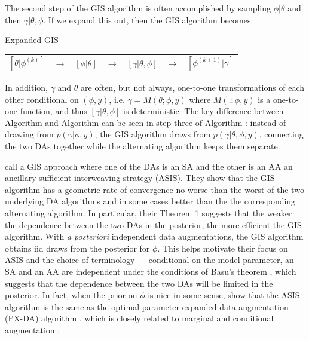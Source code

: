 \documentclass[12pt]{article}
\begin{document}
The second step of the GIS algorithm is often accomplished by sampling $\phi|\theta$ and then $\gamma|\theta,\phi$. If we expand this out, then the GIS algorithm becomes:
\begin{alg*}[eGIS]Expanded GIS\label{alg:eGIS}
  \begin{center}
    \begin{tabular}{lllllll}
      $[\theta|\phi^{(k)}]$& $\to$& $[\phi|\theta]$& $\to $&$[\gamma|\theta,\phi]$& $\to$& $[\phi^{(k+1)}|\gamma]$
    \end{tabular}
  \end{center}
\end{alg*}
\noindent
In addition, $\gamma$ and $\theta$ are often, but not always, one-to-one transformations of each other conditional on $(\phi,y)$, i.e. $\gamma = M(\theta;\phi,y)$ where $M(.;\phi,y)$ is a one-to-one function, and thus $[\gamma|\theta,\phi]$ is deterministic.
The key difference between Algorithm  and Algorithm  can be seen in step three of Algorithm : instead of drawing from $p(\gamma|\phi,y)$, the GIS algorithm draws from $p(\gamma|\theta,\phi,y)$, connecting the two DAs together while the alternating algorithm keeps them separate.

\citet{yu2011center} call a GIS approach where one of the DAs is an SA and the other is an AA an ancillary sufficient interweaving strategy (ASIS). They show that the GIS algorithm has a geometric rate of convergence no worse than the worst of the two underlying DA algorithms and in some cases better than the the corresponding alternating algorithm. In particular, their Theorem 1 suggests that the weaker the dependence between the two DAs in the posterior, the more efficient the GIS algorithm. With \emph{a posteriori} independent data augmentations, the GIS algorithm obtains iid draws from the posterior for $\phi$. This helps motivate their focus on ASIS and the choice of terminology --- conditional on the model parameter, an SA and an AA are independent under the conditions of Basu's theorem \citep{basu1955statistics}, which suggests that the dependence between the two DAs will be limited in the posterior. In fact, when the prior on $\phi$ is nice in some sense, \citet{yu2011center} show that the ASIS algorithm is the same as the optimal parameter expanded data augmentation (PX-DA) algorithm \citep{liu1999parameter}, which is closely related to marginal and conditional augmentation \citep{meng1999seeking,hobert2008theoretical}.
\end{document}
